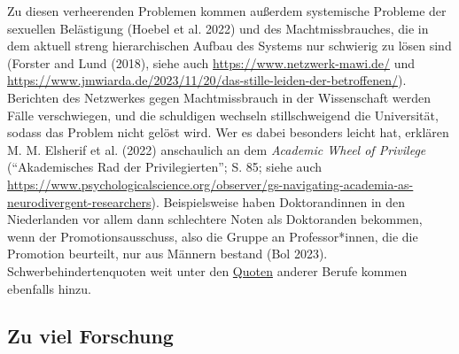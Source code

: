 \documentclass[
  letterpaper,
  DIV=11,
  numbers=noendperiod]{scrreprt}
\begin{document}
Zu diesen verheerenden Problemen kommen außerdem systemische Probleme
der sexuellen Belästigung (Hoebel et al. 2022) und des
Machtmissbrauches, die in dem aktuell streng hierarchischen Aufbau des
Systems nur schwierig zu lösen sind (Forster and Lund (2018), siehe auch
\url{https://www.netzwerk-mawi.de/} und
\url{https://www.jmwiarda.de/2023/11/20/das-stille-leiden-der-betroffenen/}).
Berichten des Netzwerkes gegen Machtmissbrauch in der Wissenschaft
werden Fälle verschwiegen, und die schuldigen wechseln stillschweigend
die Universität, sodass das Problem nicht gelöst wird. Wer es dabei
besonders leicht hat, erklären M. M. Elsherif et al. (2022) anschaulich
an dem \emph{Academic Wheel of Privilege} (``Akademisches Rad der
Privilegierten''; S. 85; siehe auch
\url{https://www.psychologicalscience.org/observer/gs-navigating-academia-as-neurodivergent-researchers}).
Beispielsweise haben Doktorandinnen in den Niederlanden vor allem dann
schlechtere Noten als Doktoranden bekommen, wenn der
Promotionsausschuss, also die Gruppe an Professor*innen, die die
Promotion beurteilt, nur aus Männern bestand (Bol 2023).
Schwerbehindertenquoten weit unter den
\href{https://www.laborjournal.de/rubric/essays/essays2023/e23_09.php}{Quoten}
anderer Berufe kommen ebenfalls hinzu.

\subsection{\texorpdfstring{\textbf{Zu viel
Forschung}}{Zu viel Forschung}}\label{zu-viel-forschung}
\end{document}

